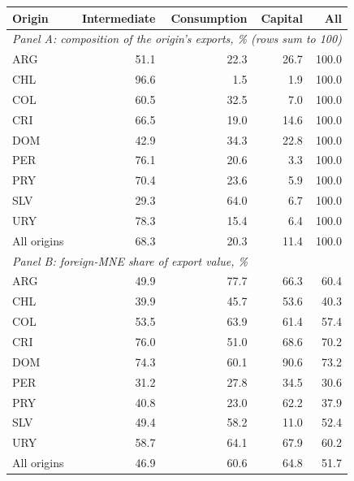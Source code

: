 \begin{tabular}{lrrrr}
\toprule
Origin & Intermediate & Consumption & Capital & All \\
\midrule
\multicolumn{5}{l}{\textit{Panel A: composition of the origin's exports, \% (rows sum to 100)}} \\
ARG & 51.1 & 22.3 & 26.7 & 100.0 \\
CHL & 96.6 & 1.5 & 1.9 & 100.0 \\
COL & 60.5 & 32.5 & 7.0 & 100.0 \\
CRI & 66.5 & 19.0 & 14.6 & 100.0 \\
DOM & 42.9 & 34.3 & 22.8 & 100.0 \\
PER & 76.1 & 20.6 & 3.3 & 100.0 \\
PRY & 70.4 & 23.6 & 5.9 & 100.0 \\
SLV & 29.3 & 64.0 & 6.7 & 100.0 \\
URY & 78.3 & 15.4 & 6.4 & 100.0 \\
All origins & 68.3 & 20.3 & 11.4 & 100.0 \\
\midrule
\multicolumn{5}{l}{\textit{Panel B: foreign-MNE share of export value, \%}} \\
ARG & 49.9 & 77.7 & 66.3 & 60.4 \\
CHL & 39.9 & 45.7 & 53.6 & 40.3 \\
COL & 53.5 & 63.9 & 61.4 & 57.4 \\
CRI & 76.0 & 51.0 & 68.6 & 70.2 \\
DOM & 74.3 & 60.1 & 90.6 & 73.2 \\
PER & 31.2 & 27.8 & 34.5 & 30.6 \\
PRY & 40.8 & 23.0 & 62.2 & 37.9 \\
SLV & 49.4 & 58.2 & 11.0 & 52.4 \\
URY & 58.7 & 64.1 & 67.9 & 60.2 \\
All origins & 46.9 & 60.6 & 64.8 & 51.7 \\
\bottomrule
\end{tabular}
